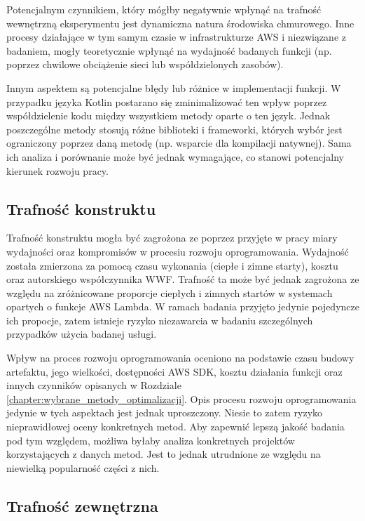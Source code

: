 Potencjalnym czynnikiem, który mógłby negatywnie wpłynąć na trafność wewnętrzną eksperymentu jest dynamiczna natura środowiska chmurowego.
Inne procesy działające w tym samym czasie w infrastrukturze AWS i niezwiązane z badaniem, mogły teoretycznie wpłynąć na wydajność badanych funkcji (np. poprzez chwilowe obciążenie sieci lub współdzielonych zasobów).

Innym aspektem są potencjalne błędy lub różnice w implementacji funkcji.
W przypadku języka Kotlin postarano się zminimalizować ten wpływ poprzez współdzielenie kodu między wszystkiem metody oparte o ten język.
Jednak poszczególne metody stosują różne biblioteki i frameworki, których wybór jest ograniczony poprzez daną metodę (np. wsparcie dla kompilacji natywnej).
Sama ich analiza i porównanie może być jednak wymagające, co stanowi potencjalny kierunek rozwoju pracy.

\subsection*{Trafność konstruktu}

Trafność konstruktu mogła być zagrożona ze poprzez przyjęte w pracy miary wydajności oraz kompromisów w procesiu rozwoju oprogramowania.
Wydajność została zmierzona za pomocą czasu wykonania (ciepłe i zimne starty), kosztu oraz autorskiego współczynnika WWF.
Trafność ta może być jednak zagrożona ze względu na zróżnicowane proporcje ciepłych i zimnych startów w systemach opartych o funkcje AWS Lambda.
W ramach badania przyjęto jedynie pojedyncze ich propocje, zatem istnieje ryzyko niezawarcia w badaniu szczególnych przypadków użycia badanej usługi.

Wpływ na proces rozwoju oprogramowania oceniono na podstawie czasu budowy artefaktu, jego wielkości, dostępności AWS SDK, kosztu działania funkcji oraz innych czynników opisanych w Rozdziale \ref{chapter:wybrane_metody_optimalizacji}.
Opis procesu rozwoju oprogramowania jedynie w tych aspektach jest jednak uproszczony.
Niesie to zatem ryzyko nieprawidłowej oceny konkretnych metod.
Aby zapewnić lepszą jakość badania pod tym względem, możliwa byłaby analiza konkretnych projektów korzystających z danych metod.
Jest to jednak utrudnione ze względu na niewielką popularność części z nich.

\subsection*{Trafność zewnętrzna}


